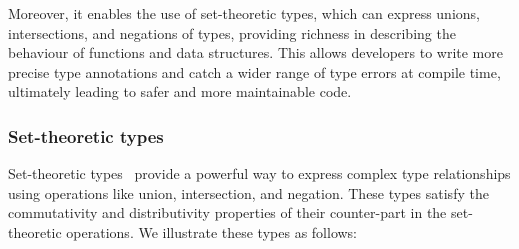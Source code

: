 Moreover, it enables the use of set-theoretic types, which can express unions, intersections, and negations of types, providing richness in describing the behaviour of functions and data structures.
This allows developers to write more precise type annotations and catch a wider range of type errors at compile time, ultimately leading to safer and more maintainable code.

\subsubsection{Set-theoretic types}

Set-theoretic types~\cite{frisch2008semantic,castagna2014polymorphic} provide a powerful way to express complex type relationships using operations like union, intersection, and negation.
These types satisfy the commutativity and distributivity properties of their counter-part in the set-theoretic operations.
We illustrate these types as follows:

